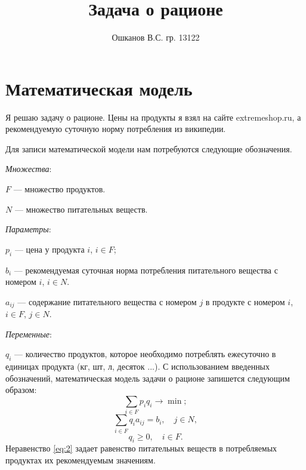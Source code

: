 \documentclass[]{article}
\title{Задача о рационе}
\author{Ошканов В.С. гр. 13122}
\begin{document}
\maketitle
\section{Математическая модель}
Я решаю задачу о рационе. Цены на продукты я взял на сайте extremeshop.ru, а рекомендуемую суточную норму потребления из википедии.

Для записи математической модели нам потребуются следующие обозначения.
\par
\textit{Множества}:
\par\noindent
$F$ --- множество продуктов.
\par\noindent
$N$ --- множество питательных веществ.
\par
\textit{Параметры}:
\par\noindent
$p_i$ --- цена у продукта $i$, $i\in F$;
\par\noindent
$b_{i}$ --- рекомендуемая суточная норма потребления питательного вещества с номером $i$, $i\in N$.
\par\noindent
$a_{ij}$ --- содержание питательного вещества с номером $j$ в продукте с номером $i$, $i\in F$, $j\in N$.
\par
\textit{Переменные}:
\par\noindent
$q_i$ --- количество продуктов, которое необходимо потреблять ежесуточно в единицах продукта (кг, шт, л, десяток ...).
С использованием введенных обозначений, математическая модель задачи о рационе запишется следующим образом:
\begin{equation}
\sum_{i\in F}p_iq_i\rightarrow\min;
\end{equation}
\begin{equation}\label{eq:2}
	\sum_{i\in F}
			q_ia_{ij} = b_i,\quad j\in N,
\end{equation}
\begin{equation}
      q_i \geq 0,\quad i\in F.
\end{equation}
Неравенство \eqref{eq:2} задает равенство питательных веществ в потребляемых продуктах их рекомендуемым значениям.
\end{document}
